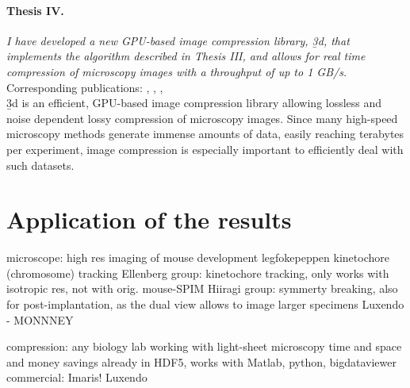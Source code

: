   \paragraph{Thesis IV.} \textit{I have  developed a new GPU-based image compression library, \b3d, that implements the algorithm described in Thesis III, and allows for real time compression of microscopy images with a throughput of up to 1 GB/s.}\\[0.5ex]
    Corresponding publications: \cite{balazs_real-time_2017}, \cite{balazs_gpu-based_2016}, \cite{balazs_gpu-based_2016-1}, \cite{balazs_gpu-based_2017}\\[0.5ex]
    \b3d is an efficient, GPU-based image compression library allowing lossless and noise dependent lossy compression of microscopy images. Since many high-speed microscopy methods generate immense amounts of data, easily reaching terabytes per experiment, image compression is especially important to efficiently deal with such datasets.


\section{Application of the results}
microscope:
high res imaging of mouse development
legfokepeppen kinetochore (chromosome) tracking
Ellenberg group: kinetochore tracking, only works with isotropic res, not with orig. mouse-SPIM
Hiiragi group: symmerty breaking, also for post-implantation, as the dual view allows to image larger specimens
Luxendo - MONNNEY

compression:
any biology lab working with light-sheet microscopy
time and space and money savings
already in HDF5, works with Matlab, python, bigdataviewer
commercial:
Imaris!
Luxendo